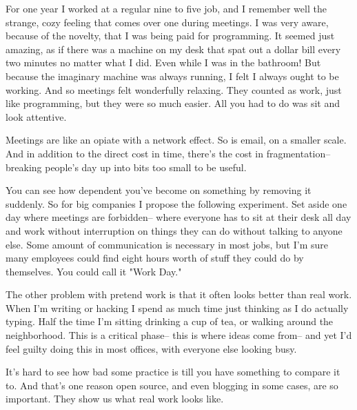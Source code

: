 For one year I worked at a regular nine to
                  five job, and I remember well the strange, cozy feeling that
                  comes over one during meetings. I was very aware, because of
                  the novelty, that I was being paid for programming. It seemed
                  just amazing, as if there was a machine on my desk that spat
                  out a dollar bill every two minutes no matter what I did. Even
                  while I was in the bathroom! But because the imaginary machine
                  was always running, I felt I always ought to be working. And
                  so meetings felt wonderfully relaxing. They counted as work,
                  just like programming, but they were so much easier. All you
                  had to do was sit and look attentive.

Meetings are
                  like an opiate with a network effect. So is email, on a
                  smaller scale. And in addition to the direct cost in time,
                  there's the cost in fragmentation-- breaking people's day up
                  into bits too small to be useful.

You can see how
                  dependent you've become on something by removing it suddenly.
                  So for big companies I propose the following experiment. Set
                  aside one day where meetings are forbidden-- where everyone
                  has to sit at their desk all day and work without interruption
                  on things they can do without talking to anyone else. Some
                  amount of communication is necessary in most jobs, but I'm
                  sure many employees could find eight hours worth of stuff they
                  could do by themselves. You could call it "Work Day."

The
                  other problem with pretend work is that it often looks better
                  than real work. When I'm writing or hacking I spend as much
                  time just thinking as I do actually typing. Half the time I'm
                  sitting drinking a cup of tea, or walking around the
                  neighborhood. This is a critical phase-- this is where ideas
                  come from-- and yet I'd feel guilty doing this in most
                  offices, with everyone else looking busy.

It's hard
                  to see how bad some practice is till you have something to
                  compare it to. And that's one reason open source, and even
                  blogging in some cases, are so important. They show us what
                  real work looks like.

